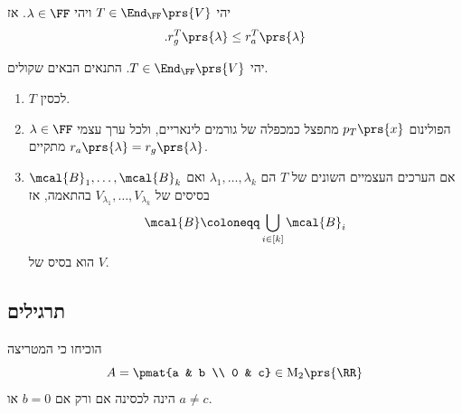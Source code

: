 \documentclass[a4paper,10pt,twoside,openany]{book}
\renewcommand{\Mat}{\mathrm{M}}
\begin{document}
\begin{proposition}
יהי
$T \in \End_\FF\prs{V}$
ויהי
$\lambda \in \FF$.
אז
\[\text{.} r_g^T\prs{\lambda} \leq r_a^T\prs{\lambda}\]
\end{proposition}

\begin{proposition} \label{proposition:diag-equivalence}
יהי
$T \in \End_\FF\prs{V}$.
התנאים הבאים שקולים.

\begin{enumerate}[label = (\alph*)]
\item $T$ לכסין.
\item הפולינום
$p_T\prs{x}$
מתפצל כמכפלה של גורמים לינאריים, ולכל ערך עצמי
$\lambda \in \FF$
מתקיים
$r_a\prs{\lambda} = r_g\prs{\lambda}$.
\item אם הערכים העצמיים השונים של
$T$
הם
$\lambda_1, \ldots, \lambda_k$
ואם
$\mcal{B}_1, \ldots, \mcal{B}_k$
בסיסים של
$V_{\lambda_1}, \ldots, V_{\lambda_k}$
בהתאמה, אז
\[\mcal{B} \coloneqq \bigcup_{i \in [k]} \mcal{B}_i\]
הוא בסיס של
$V$.
\end{enumerate}
\end{proposition}

\subsection{תרגילים}

\begin{exercisechap}
הוכיחו כי המטריצה
\[A = \pmat{a & b \\ 0 & c} \in \Mat_2\prs{\RR}\]
הינה לכסינה אם ורק אם
$b = 0$
או
$a \neq c$.
\end{exercisechap}
\end{document}
